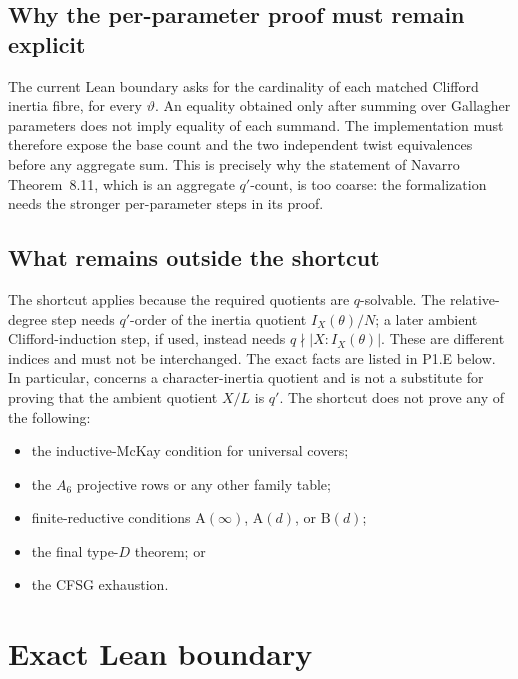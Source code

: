 \documentclass[11pt]{article}
\begin{document}
\subsection{Why the per-parameter proof must remain explicit}

The current Lean boundary asks for the cardinality of each matched
Clifford inertia fibre, for every \(\vartheta\).  An equality obtained only
after summing over Gallagher parameters does not imply equality of each
summand.  The implementation must therefore expose the base count and the
two independent twist equivalences before any aggregate sum.  This is
precisely why the statement of Navarro Theorem~8.11, which is an aggregate
\(q'\)-count, is too coarse: the formalization needs the stronger
per-parameter steps in its proof.

\subsection{What remains outside the shortcut}

The shortcut applies because the required quotients are \(q\)-solvable.
The relative-degree step needs \(q'\)-order of the inertia quotient
\(I_X(\theta)/N\); a later ambient Clifford-induction step, if used, instead
needs \(q\nmid |X:I_X(\theta)|\).  These are different indices and must not
be interchanged.  The exact facts are listed in P1.E below.  In particular,
 concerns a
character-inertia quotient and is not a substitute for proving that the
ambient quotient \(X/L\) is \(q'\).  The shortcut does not prove any of
the following:

\begin{itemize}
  \item the inductive-McKay condition for universal covers;
  \item the \(A_6\) projective rows or any other family table;
  \item finite-reductive conditions \(\mathrm A(\infty)\),
  \(\mathrm A(d)\), or \(\mathrm B(d)\);
  \item the final type-\(D\) theorem; or
  \item the CFSG exhaustion.
\end{itemize}

\section{Exact Lean boundary}
\end{document}
